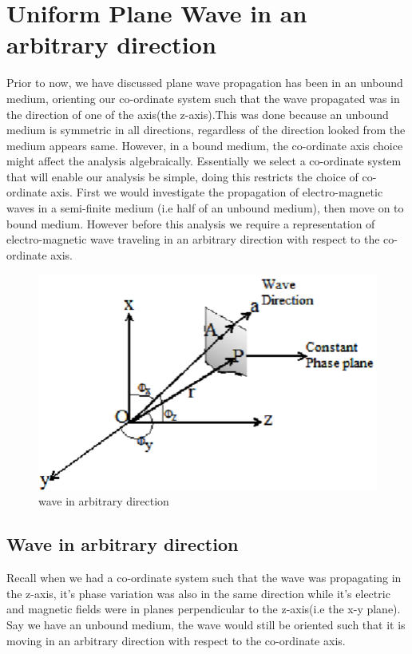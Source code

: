 \chapter{Uniform Plane Wave in an arbitrary direction}

Prior to now, we have discussed  plane wave propagation has been in an unbound medium, orienting our co-ordinate system such that the wave propagated was in the direction of one of the axis(the z-axis).This was done because an unbound medium is symmetric in all directions, regardless of the direction looked from the medium appears same.
However, in a bound medium, the co-ordinate axis choice might affect the analysis algebraically.
Essentially we select a co-ordinate system that will enable our analysis be simple, doing this restricts the choice of co-ordinate axis. First we would investigate the propagation of electro-magnetic waves in a semi-finite medium (i.e half of an unbound medium), then move on to bound medium. However before this analysis we require a representation of electro-magnetic wave traveling in an arbitrary direction with respect to the co-ordinate axis.
\begin{figure}[h]
\centering
\includegraphics[scale=0.3]{./graphics/em-waves}
\caption{wave in arbitrary direction}
\end{figure}

\section{\textbf{Wave in arbitrary direction}}
Recall when we had a co-ordinate system such that the wave was propagating in the z-axis, it's phase variation was also in the same direction while it's electric and magnetic fields were in planes perpendicular to the z-axis(i.e the x-y plane).
Say we have an unbound medium, the wave would still be oriented such that it is moving in an arbitrary direction with respect to the co-ordinate axis.

